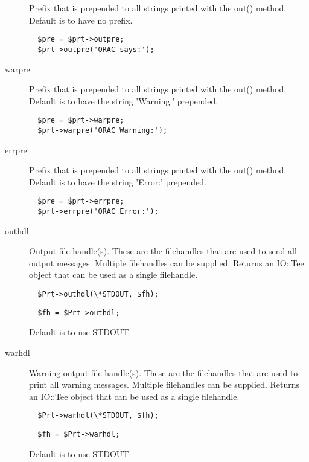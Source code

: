 \begin{description}
Prefix that is prepended to all strings printed with the
out() method. Default is to have no prefix.

\begin{verbatim}
  $pre = $prt->outpre;
  $prt->outpre('ORAC says:');
\end{verbatim}
\item[warpre] \mbox{}

Prefix that is prepended to all strings printed with the
out() method. Default is to have the string 'Warning:' prepended.

\begin{verbatim}
  $pre = $prt->warpre;
  $prt->warpre('ORAC Warning:');
\end{verbatim}
\item[errpre] \mbox{}

Prefix that is prepended to all strings printed with the
out() method. Default is to have the string 'Error:' prepended.

\begin{verbatim}
  $pre = $prt->errpre;
  $prt->errpre('ORAC Error:');
\end{verbatim}
\item[outhdl] \mbox{}

Output file handle(s). These are the filehandles that are used
to send all output messages. Multiple filehandles can be supplied.
Returns an IO::Tee object that can be used as a single filehandle.

\begin{verbatim}
  $Prt->outhdl(\*STDOUT, $fh);
\end{verbatim}
\begin{verbatim}
  $fh = $Prt->outhdl;
\end{verbatim}


Default is to use STDOUT.

\item[warhdl] \mbox{}

Warning output file handle(s). These are the filehandles that are used
to print all warning messages. Multiple filehandles can be supplied.
Returns an IO::Tee object that can be used as a single filehandle.

\begin{verbatim}
  $Prt->warhdl(\*STDOUT, $fh);
\end{verbatim}
\begin{verbatim}
  $fh = $Prt->warhdl;
\end{verbatim}


Default is to use STDOUT.


\end{description}
